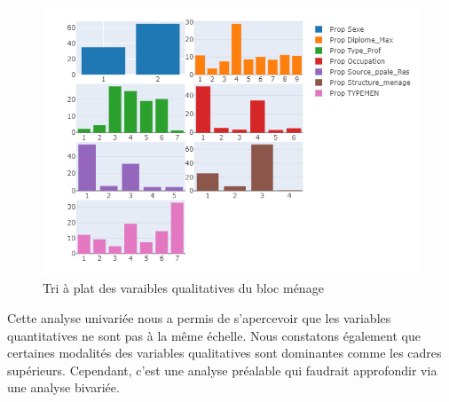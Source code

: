 \documentclass[11pt,a4paper, x11names]{article}\usepackage[]{graphicx}\usepackage[]{color}
\begin{document}
\begin{figure}[H]
\includegraphics[scale=0.7]{graphiques/tri_plat.png}
\caption{Tri à plat des varaibles qualitatives du bloc ménage} \label{fig1:tri_plat}
\end{figure}
Cette analyse univariée nous a permis de s'apercevoir que les variables quantitatives ne sont pas à la même échelle. Nous constatons également que certaines modalités des variables qualitatives sont dominantes comme les cadres supérieurs. Cependant, c'est une analyse préalable qui faudrait approfondir via une analyse bivariée.

\end{document}
